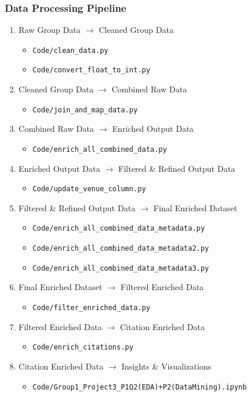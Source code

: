 \documentclass[12pt]{article}
\begin{document}
\subsubsection{Data Processing Pipeline}
\begin{enumerate}[label=\textbf{Step \arabic*:}]
    \item Raw Group Data $\rightarrow$ Cleaned Group Data
    \begin{itemize}
        \item \texttt{Code/clean\_data.py}
        \item \texttt{Code/convert\_float\_to\_int.py}
    \end{itemize}
    \item Cleaned Group Data $\rightarrow$ Combined Raw Data
    \begin{itemize}
        \item \texttt{Code/join\_and\_map\_data.py}
    \end{itemize}
    \item Combined Raw Data $\rightarrow$ Enriched Output Data
    \begin{itemize}
        \item \texttt{Code/enrich\_all\_combined\_data.py}
    \end{itemize}
    \item Enriched Output Data $\rightarrow$ Filtered \& Refined Output Data
    \begin{itemize}
        \item \texttt{Code/update\_venue\_column.py}
    \end{itemize}
    \item Filtered \& Refined Output Data $\rightarrow$ Final Enriched Dataset
    \begin{itemize}
        \item \texttt{Code/enrich\_all\_combined\_data\_metadata.py}
        \item \texttt{Code/enrich\_all\_combined\_data\_metadata2.py}
        \item \texttt{Code/enrich\_all\_combined\_data\_metadata3.py}
    \end{itemize}
    \item Final Enriched Dataset $\rightarrow$ Filtered Enriched Data
    \begin{itemize}
        \item \texttt{Code/filter\_enriched\_data.py}
    \end{itemize}
    \item Filtered Enriched Data $\rightarrow$ Citation Enriched Data
    \begin{itemize}
        \item \texttt{Code/enrich\_citations.py}
    \end{itemize}
    \item Citation Enriched Data $\rightarrow$ Insights \& Visualizations
    \begin{itemize}
        \item \texttt{Code/Group1\_Project3\_P1Q2(EDA)+P2(DataMining).ipynb}
    \end{itemize}
\end{enumerate}
\end{document}
